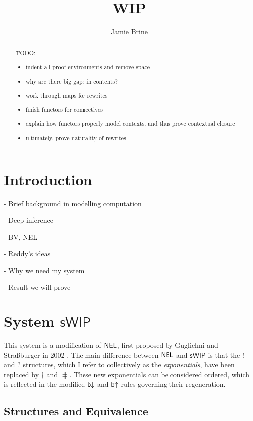 \documentclass[12pt, oneside]{article}
\title{WIP}
\author{Jamie Brine}
\theoremstyle{plain}
\theoremstyle{definition}
\let\originaldagger\dagger
\renewcommand{\dag}{\mathord{\originaldagger}}
\newcommand{\sSys}{{\mathsf{sWIP}}}%
\begin{document}
\maketitle

\begin{abstract}
    TODO:
    \begin{itemize}
        \item indent all proof environments and remove space
        \item why are there big gaps in contents?
        \item work through maps for rewrites
        \item finish functors for connectives
        \item explain how functors properly model contexts, and thus prove contextual closure
        \item ultimately, prove naturality of rewrites
    \end{itemize}
\end{abstract}

\newpage
\tableofcontents

\newpage
\section{Introduction}

- Brief background in modelling computation

- Deep inference

- BV, NEL

- Reddy's ideas

- Why we need my system

- Result we will prove

\newpage
\section{System $\sSys$}

This system is a modification of ${\mathsf{NEL}}$, first proposed by Guglielmi and Straßburger in 2002 \cite{guglielmi2002non}.
The main difference between ${\mathsf{NEL}}$ and $\sSys$ is that the $!$ and $?$ structures, which I refer to collectively as the \textit{exponentials}, have been replaced by $\dag$ and $\hash$.
These new exponentials can be considered ordered, which is reflected in the modified ${\mathsf b}{\downarrow}$ and ${\mathsf b}{ \uparrow}$ rules governing their regeneration.

\subsection{Structures and Equivalence}
\end{document}
